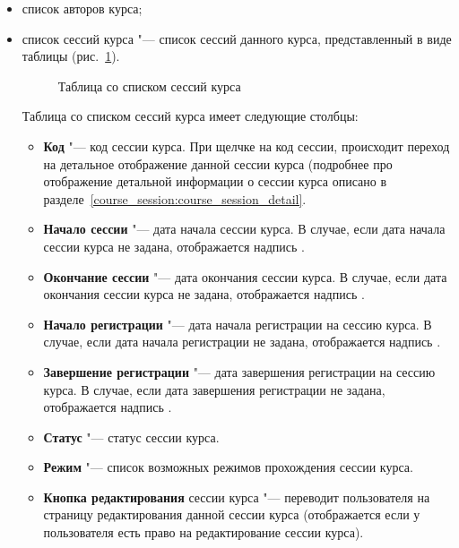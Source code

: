 \begin{itemize}
	\item список авторов курса;
\item список сессий курса "--- список сессий данного курса, представленный в виде таблицы  (рис.~\ref{img:course:course_session_table}).
\begin{figure}[H]
	\caption{Таблица со списком сессий курса}
	\label{img:course:course_session_table}
\end{figure}

Таблица со списком сессий курса имеет следующие столбцы:
\begin{itemize}
	\item \textbf{Код} "--- код сессии курса. При щелчке на код сессии, происходит переход на детальное отображение данной сессии курса (подробнее про отображение детальной информации о сессии курса описано в разделе~\ref{course_session:course_session_detail}.
	\item \textbf{Начало сессии} "--- дата начала сессии курса. В случае, если дата начала сессии курса не задана, отображается надпись .
	\item \textbf{Окончание сессии} "--- дата окончания сессии курса. В случае, если дата окончания сессии курса не задана, отображается надпись .
	\item \textbf{Начало регистрации} "--- дата начала регистрации на сессию курса. В случае, если дата начала регистрации не задана, отображается надпись .
	\item \textbf{Завершение регистрации} "--- дата завершения регистрации на сессию курса. В случае, если дата завершения регистрации не задана, отображается надпись .
	\item \textbf{Статус} "--- статус сессии курса.
	\item \textbf{Режим} "--- список возможных режимов прохождения сессии курса.
	\item \textbf{Кнопка редактирования} сессии курса  "--- переводит пользователя на страницу редактирования данной сессии курса (отображается если у пользователя есть право на редактирование сессии курса).
\end{itemize}
\end{itemize}

